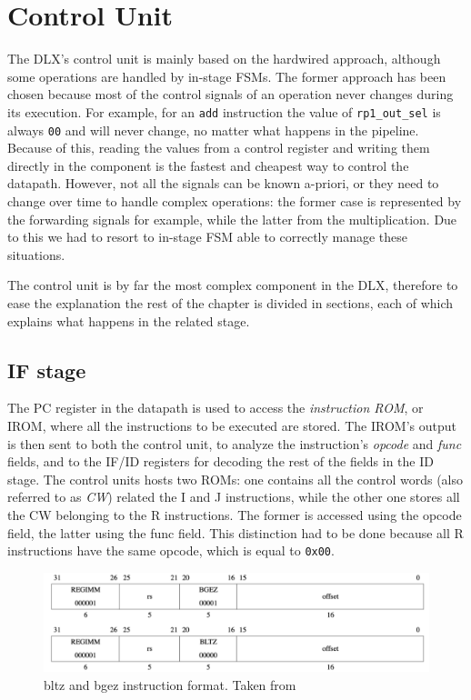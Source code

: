 \chapter{Control Unit}
\label{chap:cu}

The DLX's control unit is mainly based on the hardwired approach, although some operations are handled by in-stage FSMs. The former approach has been chosen
because most of the control signals of an operation never changes during its execution. For example, for an \verb|add| instruction the value of \verb|rp1_out_sel|
is always \verb|00| and will never change, no matter what happens in the pipeline. Because of this, reading the values from a control register and writing them directly in the
component is the fastest and cheapest way to control the datapath. However, not all the signals can be known a-priori, or they need to change over time to handle complex operations:
the former case is represented by the forwarding signals for example, while the latter from the multiplication. Due to this we had to resort to in-stage FSM able to correctly manage
these situations.

The control unit is by far the most complex component in the DLX, therefore to ease the explanation the rest of the chapter is divided in sections, each of which explains what happens
in the related stage. 

\section{IF stage}
\label{sec:cu_IF_stage}

The PC register in the datapath is used to access the {\it instruction ROM}, or IROM, where all the instructions to be executed are stored. The IROM's output is then sent to both the
control unit, to analyze the instruction's {\it opcode} and {\it func} fields, and to the IF/ID registers for decoding the rest of the fields in the ID stage.
The control units hosts two ROMs: one contains all the control words (also referred to as {\it CW}) related the I and J instructions, while the other one stores all the CW belonging
to the R instructions. The former is accessed using the opcode field, the latter using the func field. This distinction had to be done because all R instructions have the same opcode,
which is equal to \verb|0x00|.

\begin{figure}[!ht]
	\centering
	\includegraphics[width=\linewidth]{./chapters/figures/bltz_bgez.pdf}
    \caption{bltz and bgez instruction format. Taken from \cite{MIPS64_arch}}
    \label{fig:bltz_bgez}
\end{figure}

